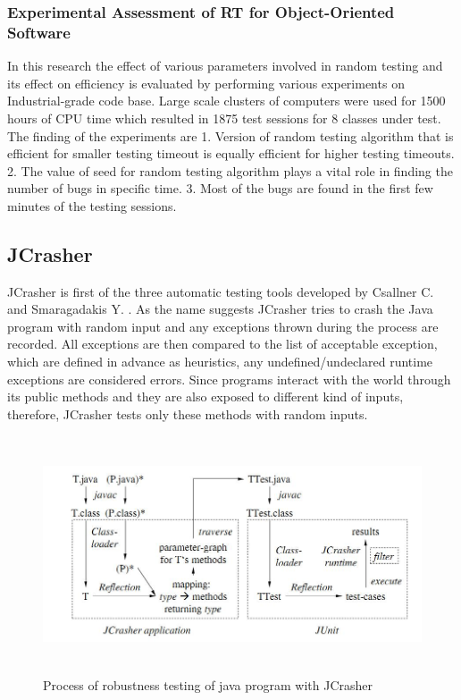\subsubsection{Experimental Assessment of RT for Object-Oriented Software}
In this research the effect of various parameters involved in random testing and its effect on efficiency is evaluated by performing various experiments on Industrial-grade code base.
Large scale clusters of computers were used for 1500 hours of CPU time which resulted in 1875 test sessions for 8 classes under test. \cite{Ciupa2007} The finding of the experiments are
1. Version of random testing algorithm that is efficient for smaller testing timeout is equally efficient for higher testing timeouts.
2. The value of seed for random testing algorithm plays a vital role in finding the number of bugs in specific time.
3. Most of the bugs are found in the first few minutes of the testing sessions.



\subsection{JCrasher}

JCrasher is first of the three automatic testing tools developed by Csallner C. and Smaragadakis Y. \cite{Pacheco2007b}. As the name suggests JCrasher tries to crash the Java program with random input and any exceptions thrown during the process are recorded. All exceptions are then compared to the list of acceptable exception, which are defined in advance as heuristics, any undefined/undeclared runtime exceptions are considered errors. Since programs interact with the world through its public methods and they are also exposed to different kind of inputs, therefore, JCrasher tests only these methods with random inputs. 

\begin{figure}[h]
	\centering
	\includegraphics[width=15cm, height=7cm]{Literature/jcrasher.png}
	\caption{Process of robustness testing of java program with JCrasher \cite{Pacheco2007b}}
	\label{fig:jcrasher}
\end{figure}

